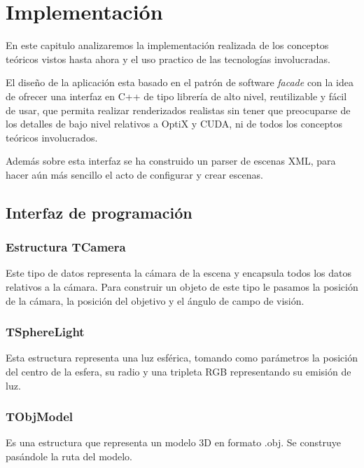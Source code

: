 \chapter{Implementación}

En este capitulo analizaremos la implementación realizada de los conceptos teóricos vistos hasta ahora y el uso practico de las tecnologías involucradas.

\medskip

El diseño de la aplicación esta basado en el patrón de software \emph{facade} con la idea de ofrecer una interfaz en C++ de tipo librería de alto nivel, reutilizable y fácil de usar, que permita realizar renderizados realistas sin tener que preocuparse de los detalles de bajo nivel relativos a OptiX y CUDA, ni de todos los conceptos teóricos involucrados.

\medskip

Además sobre esta interfaz se ha construido un parser de escenas XML, para hacer aún más sencillo el acto de configurar y crear escenas.

\clearpage

\section{Interfaz de programación}

\subsection{Estructura TCamera}

Este tipo de datos representa la cámara de la escena y encapsula todos los datos relativos a la cámara. Para construir un objeto de este tipo le pasamos la posición de la cámara, la posición del objetivo y el ángulo de campo de visión.

\subsection{TSphereLight}

Esta estructura representa una luz esférica, tomando como parámetros la posición del centro de la esfera, su radio y una tripleta RGB representando su emisión de luz.

\subsection{TObjModel}

Es una estructura que representa un modelo 3D en formato .obj. Se construye pasándole la ruta del modelo. 

